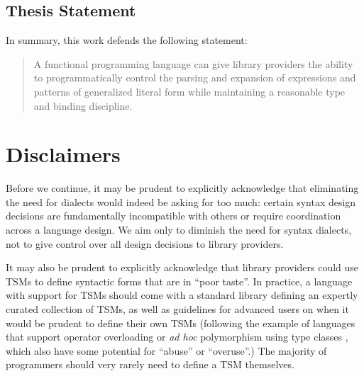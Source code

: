 \subsection*{Thesis Statement}
In summary, this work defends the following statement:

\begin{quote}
A functional programming language can give library providers the ability to %
programmatically control the parsing and expansion of expressions and patterns of generalized literal form while maintaining a reasonable type and binding discipline. %
\end{quote}
\section{Disclaimers}
Before we continue, it may be prudent to explicitly acknowledge that eliminating the need for dialects would indeed be asking for too much: certain syntax design decisions are fundamentally incompatible with others or require coordination across a language design. We aim only to diminish the need for syntax dialects, not to give control over all design decisions to library providers. %

It may also be prudent to explicitly acknowledge that library providers could use TSMs  to define syntactic forms that are in ``poor taste''. In practice, a language with support for TSMs should come with a standard library defining an expertly curated collection of TSMs, as well as guidelines for advanced users on when it would be prudent to define their own TSMs (following the example of languages that support operator overloading or \emph{ad hoc} polymorphism using type classes \cite{Hall:1996:TCH:227699.227700,conf/popl/DreyerHCK07}, which also have some potential for ``abuse'' or ``overuse''.) %
The majority of programmers should very rarely need to define a TSM themselves.

